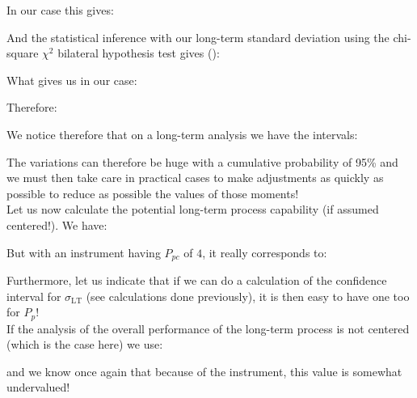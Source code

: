 	\pagebreak
	\begin{tcolorbox}[colframe=black,colback=white,sharp corners]
	In our case this gives:
	
	And the statistical inference with our long-term standard deviation using the chi-square $\chi^2$ bilateral hypothesis test gives ():
	
	What gives us in our case:
	
	Therefore:
	
	We notice therefore that on a long-term analysis we have the intervals:
	
	The variations can therefore be huge with a cumulative probability of 95\% and we must then take care in practical cases to make adjustments as quickly as possible to reduce as possible the values of those moments!\\
	
	Let us now calculate the potential long-term process capability (if assumed centered!). We have:
	
	But with an instrument having $P_{pc}$ of $4$, it really corresponds to:
	
	Furthermore, let us indicate that if we can do a calculation of the confidence interval for $\sigma_{\text{LT}}$ (see calculations done previously), it is then easy to have one too for $P_p$!\\
	If the analysis of the overall performance of the long-term process is not centered (which is the case here)  we use:
		
	and we know once again that because of the instrument, this value is somewhat undervalued!
	\end{tcolorbox}
	
